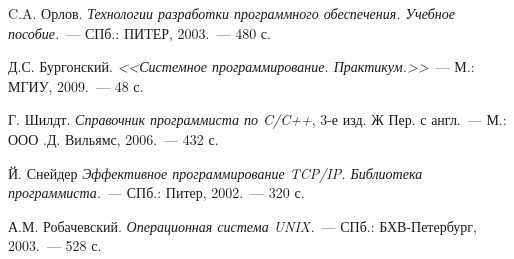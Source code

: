 \newpage
\renewcommand{\bibname}{Список литературы и интернет-ресурсов}
\begin{thebibliography}{2009}

C.A. Орлов.
{\em Технологии разработки программного обеспечения. Учебное пособие.}~--- СПб.:
ПИТЕР, 2003.~--- 480 с.



Д.С. Бургонский.
{\em <<Системное программирование. Практикум.>>}~--- М.:
МГИУ, 2009.~--- 48 с.

Г. Шилдт.
{\em Справочник программиста по C/C++}, 3-е изд. Ж Пер. с англ.~--- М.:
ООО .Д. Вильямс\grqq, 2006.~--- 432 с.

Й. Снейдер
{\em Эффективное программирование TCP/IP. Библиотека программиста.}~--- СПб.: Питер, 2002.~--- 320 с.

А.М. Робачевский.  
{\em Операционная система UNIX.}~--- СПб.: БХВ-Петербург, 2003.~--- 528 с.

\end{thebibliography}

\endinput

